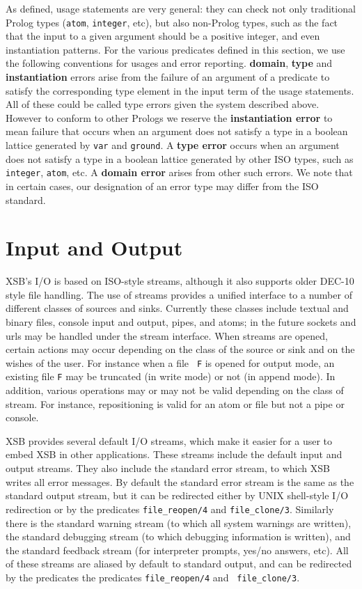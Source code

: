 As defined, usage statements are very general: they can check not only
traditional Prolog types ({\tt atom}, {\tt integer}, etc), but also
non-Prolog types, such as the fact that the input to a given argument
should be a positive integer, and even instantiation patterns.  For
the various predicates defined in this section, we use the following
conventions for usages and error reporting.  {\bf domain}, {\bf type}
and {\bf instantiation} errors arise from the failure of an argument
of a predicate to satisfy the corresponding type element in the input
term of the usage statements.  All of these could be called type
errors given the system described above.  However to conform to other
Prologs we reserve the {\bf instantiation error} to mean failure that
occurs when an argument does not satisfy a type in a boolean lattice
generated by {\tt var} and {\tt ground}.  A {\bf type error} occurs
when an argument does not satisfy a type in a boolean lattice
generated by other ISO types, such as {\tt integer}, {\tt atom}, etc.
A {\bf domain error} arises from other such errors.  We note that in
certain cases, our designation of an error type may differ from the
ISO standard.

\section{Input and Output}

XSB's I/O is based on ISO-style streams, although it also supports
older DEC-10 style file handling.  The use of streams provides a
unified interface to a number of different classes of sources and
sinks.  Currently these classes include textual and binary files,
console input and output, pipes, and atoms; in the future sockets and
urls may be handled under the stream interface.  When streams are
opened, certain actions may occur depending on the class of the source
or sink and on the wishes of the user.  For instance when a file {\tt
F} is opened for output mode, an existing file {\tt F} may be
truncated (in write mode) or not (in append mode).  In addition,
various operations may or may not be valid depending on the class of
stream.  For instance, repositioning is valid for an atom or file but
not a pipe or console.

XSB provides several default I/O streams, which make it easier for a
user to embed XSB in other applications.  These streams include the
default input and output streams.  They also include the standard
error stream, to which XSB writes all error messages.  By default the
standard error stream is the same as the standard output stream, but
it can be redirected either by UNIX shell-style I/O redirection or by
the predicates {\tt file\_reopen/4} and {\tt file\_clone/3}.
Similarly there is the standard warning stream (to which all system
warnings are written), the standard debugging stream (to which
debugging information is written), and the standard feedback stream
(for interpreter prompts, yes/no answers, etc).  All of these streams
are aliased by default to standard output, and can be redirected by
the predicates the predicates {\tt file\_reopen/4} and {\tt
file\_clone/3}.

